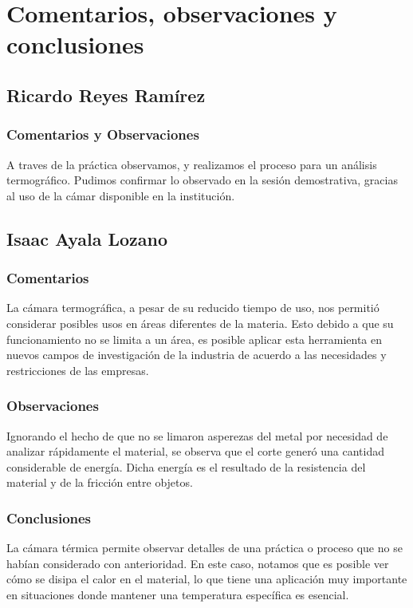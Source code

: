 \section{Comentarios, observaciones y conclusiones}
\subsection{Ricardo Reyes Ram\'irez}
\subsubsection{Comentarios y Observaciones}
A traves de la pr\'actica observamos, y realizamos el proceso para un an\'alisis termogr\'afico.
Pudimos confirmar lo observado en la sesi\'on demostrativa, gracias al uso de la c\'amar disponible
en la instituci\'on.

\subsection{Isaac Ayala Lozano}
\subsubsection{Comentarios}
La c\'amara termogr\'afica, a pesar de su reducido tiempo de uso, nos permiti\'o considerar posibles usos
en \'areas diferentes de la materia. Esto debido a que su funcionamiento no se limita a un \'area, es posible
aplicar esta herramienta en nuevos campos de investigaci\'on de la industria de acuerdo a las necesidades y
restricciones de las empresas.

\subsubsection{Observaciones}
Ignorando el hecho de que no se limaron asperezas del metal por necesidad de analizar r\'apidamente el material,
se observa que el corte gener\'o una cantidad considerable de energ\'ia. Dicha energ\'ia es el resultado de la
resistencia del material y de la fricci\'on entre objetos.

\subsubsection{Conclusiones}
La c\'amara t\'ermica permite observar detalles de una pr\'actica o proceso que no se hab\'ian considerado con anterioridad.
En este caso, notamos que es posible ver c\'omo se disipa el calor en el material, lo que tiene una aplicaci\'on muy importante
en situaciones donde mantener una temperatura espec\'ifica es esencial.

